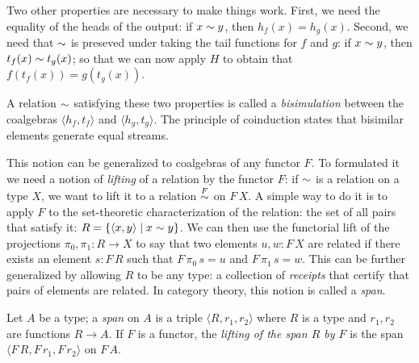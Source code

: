 Two other properties are necessary to make things work.
First, we need the equality of the heads of the output: if $x\sim y$, then $h_f(x) = h_g(x)$.
Second, we need that $\sim$ is preseved under taking the tail functions for $f$ and $g$: if $x\sim y$, then $t_f(x) \sim t_g(x)$; so that we can now apply $H$ to obtain that $f(t_f(x)) = g(t_g(x))$.

A relation $\sim$ satisfying these two properties is called a {\em bisimulation} between the coalgebras $\langle h_f, t_f\rangle$ and $\langle h_g, t_g\rangle$.
The principle of coinduction states that bisimilar elements generate equal streams.

This notion can be generalized to coalgebras of any functor $F$.
To formulated it we need a notion of {\em lifting} of a relation by the functor $F$: if $\sim$ is a relation on a type $X$, we want to lift it to a relation $\mathrel{\stackrel{F}{\sim}}$ on $F\,X$.
A simple way to do it is to apply $F$ to the set-theoretic characterization of the relation: the set of all pairs that satisfy it: $R = \{ \langle x, y \rangle \mid x \sim y\}$.
We can then use the functorial lift of the projections $\pi_0, \pi_1:R \rightarrow X$ to say that two elements $u,w:F\,X$ are related if there exists an element $s:F\,R$ such that $F\,\pi_0\,s = u$ and $F\,\pi_1\,s = w$.
This can be further generalized by allowing $R$ to be any type: a collection of {\em receipts} that certify that pairs of elements are related. 
In category theory, this notion is called a {\em span}.

\begin{definition}\label{def:span}
Let $A$ be a type; a {\em span} on $A$ is a triple $\langle R,r_1,r_2\rangle$ where $R$ is a type and $r_1, r_2$ are functions $R\rightarrow A$.
If $F$ is a functor, the {\em lifting of the span $R$ by $F$} is the span $\langle F\,R,F\,r_1,F\,r_2\rangle$ on $F\,A$.
\end{definition}

